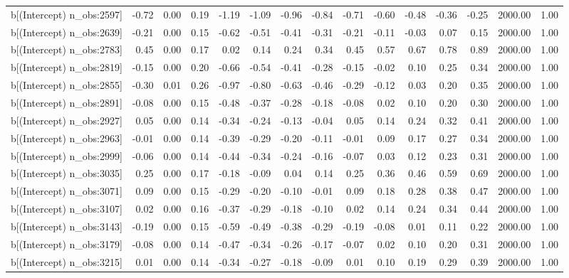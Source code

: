 \begin{table}[ht]
\begin{tabular}{rrrrrrrrrrrrrrr}
  b[(Intercept) n\_obs:2597] & -0.72 & 0.00 & 0.19 & -1.19 & -1.09 & -0.96 & -0.84 & -0.71 & -0.60 & -0.48 & -0.36 & -0.25 & 2000.00 & 1.00 \\ 
  b[(Intercept) n\_obs:2639] & -0.21 & 0.00 & 0.15 & -0.62 & -0.51 & -0.41 & -0.31 & -0.21 & -0.11 & -0.03 & 0.07 & 0.15 & 2000.00 & 1.00 \\ 
  b[(Intercept) n\_obs:2783] & 0.45 & 0.00 & 0.17 & 0.02 & 0.14 & 0.24 & 0.34 & 0.45 & 0.57 & 0.67 & 0.78 & 0.89 & 2000.00 & 1.00 \\ 
  b[(Intercept) n\_obs:2819] & -0.15 & 0.00 & 0.20 & -0.66 & -0.54 & -0.41 & -0.28 & -0.15 & -0.02 & 0.10 & 0.25 & 0.34 & 2000.00 & 1.00 \\ 
  b[(Intercept) n\_obs:2855] & -0.30 & 0.01 & 0.26 & -0.97 & -0.80 & -0.63 & -0.46 & -0.29 & -0.12 & 0.03 & 0.20 & 0.35 & 2000.00 & 1.00 \\ 
  b[(Intercept) n\_obs:2891] & -0.08 & 0.00 & 0.15 & -0.48 & -0.37 & -0.28 & -0.18 & -0.08 & 0.02 & 0.10 & 0.20 & 0.30 & 2000.00 & 1.00 \\ 
  b[(Intercept) n\_obs:2927] & 0.05 & 0.00 & 0.14 & -0.34 & -0.24 & -0.13 & -0.04 & 0.05 & 0.14 & 0.24 & 0.32 & 0.41 & 2000.00 & 1.00 \\ 
  b[(Intercept) n\_obs:2963] & -0.01 & 0.00 & 0.14 & -0.39 & -0.29 & -0.20 & -0.11 & -0.01 & 0.09 & 0.17 & 0.27 & 0.34 & 2000.00 & 1.00 \\ 
  b[(Intercept) n\_obs:2999] & -0.06 & 0.00 & 0.14 & -0.44 & -0.34 & -0.24 & -0.16 & -0.07 & 0.03 & 0.12 & 0.23 & 0.31 & 2000.00 & 1.00 \\ 
  b[(Intercept) n\_obs:3035] & 0.25 & 0.00 & 0.17 & -0.18 & -0.09 & 0.04 & 0.14 & 0.25 & 0.36 & 0.46 & 0.59 & 0.69 & 2000.00 & 1.00 \\ 
  b[(Intercept) n\_obs:3071] & 0.09 & 0.00 & 0.15 & -0.29 & -0.20 & -0.10 & -0.01 & 0.09 & 0.18 & 0.28 & 0.38 & 0.47 & 2000.00 & 1.00 \\ 
  b[(Intercept) n\_obs:3107] & 0.02 & 0.00 & 0.16 & -0.37 & -0.29 & -0.18 & -0.10 & 0.02 & 0.14 & 0.24 & 0.34 & 0.44 & 2000.00 & 1.00 \\ 
  b[(Intercept) n\_obs:3143] & -0.19 & 0.00 & 0.15 & -0.59 & -0.49 & -0.38 & -0.29 & -0.19 & -0.08 & 0.01 & 0.11 & 0.22 & 2000.00 & 1.00 \\ 
  b[(Intercept) n\_obs:3179] & -0.08 & 0.00 & 0.14 & -0.47 & -0.34 & -0.26 & -0.17 & -0.07 & 0.02 & 0.10 & 0.20 & 0.31 & 2000.00 & 1.00 \\ 
  b[(Intercept) n\_obs:3215] & 0.01 & 0.00 & 0.14 & -0.34 & -0.27 & -0.18 & -0.09 & 0.01 & 0.10 & 0.19 & 0.29 & 0.39 & 2000.00 & 1.00 \\ 

\end{tabular}
\end{table}
